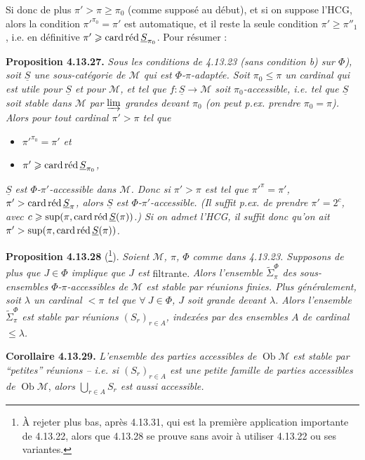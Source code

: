 \documentclass[11pt]{article}
\newcommand{\msp}[1]{\marginpar{\footnotesize [#1]}}
\newcommand{\Ob}{\operatorname{Ob}}
\newcommand{\cardred}{\mathop{\textup{card\,réd}}\nolimits}
\begin{document}
\msp{page 348}
Si donc de plus $\pi'>\pi\geqslant\pi_0$ (comme supposé au début), et si on suppose l'HCG, alors la condition $\pi'^{\pi_0}=\pi'$ est automatique, et il reste la seule condition $\pi'\geqslant\pi''_1$, i.e. en définitive $\pi'\geqslant\cardred\underline{S}_{\pi_0}$. Pour résumer :

\textbf{Proposition 4.13.27.} \textit{Sous les conditions de 4.13.23 (sans condition b) sur $\Phi$), soit $\underline{S}$ une sous-catégorie de $\mathcal{M}$ qui est $\Phi$-$\pi$-adaptée. Soit $\pi_0\leqslant\pi$ un cardinal qui est utile pour $\underline{S}$ et pour $\mathcal{M}$, et tel que $f:\underline{S}\longrightarrow\mathcal{M}$ soit $\pi_0$-accessible, i.e. tel que $\underline{S}$ soit stable dans $\mathcal{M}$ par $\varinjlim$ grandes devant $\pi_0$ (on peut p.ex. prendre $\pi_0=\pi$). Alors pour tout cardinal $\pi'>\pi$ tel que}
\begin{itemize}[leftmargin=2.5em]
\item[\textit{a)}] \textit{$\pi'^{\pi_0}=\pi'$ et}
\item[\textit{b)}] \textit{$\pi'\geqslant\cardred\underline{S}_{\pi_0}$,}
\end{itemize}
\textit{$\underline{S}$ est $\Phi$-$\pi'$-accessible dans $\mathcal{M}$. Donc si $\pi'>\pi$ est tel que $\pi'^{\pi}=\pi'$, $\pi'>\cardred\underline{S}_\pi$, alors $\underline{S}$ est $\Phi$-$\pi'$-accessible. (Il suffit p.ex. de prendre $\pi'=2^c$, avec $c\geqslant\sup(\pi,\cardred\underline{S}(\pi))$.) Si on admet l'HCG, il suffit donc qu'on ait $\pi'>\sup(\pi,\cardred\underline{S}(\pi))$.}

\msp{page 349}
\textbf{Proposition 4.13.28} (\footnote{À rejeter plus bas, après 4.13.31, qui est la première application importante de 4.13.22, alors que 4.13.28 se prouve sans avoir à utiliser 4.13.22 ou ses variantes.}). \textit{Soient $\mathcal{M}$, $\pi$, $\Phi$ comme dans 4.13.23. Supposons de plus que $J\in\Phi$ implique que $J$ est} filtrante. \textit{Alors l'ensemble $\tilde{\Sigma}^{\Phi}_{\pi}$ des sous-ensembles $\Phi$-$\pi$-accessibles de $\mathcal{M}$ est stable par réunions finies. Plus généralement, soit $\lambda$ un cardinal $<\pi$ tel que $\forall\ J\in\Phi$, $J$ soit grande devant $\lambda$. Alors l'ensemble $\tilde{\Sigma}^{\Phi}_{\pi}$ est stable par réunions $(S_r)_{r\in A}$, indexées par des ensembles $A$ de cardinal $\leqslant\lambda$.}

\textbf{Corollaire 4.13.29.} \textit{L'ensemble des parties accessibles de} $\Ob\mathcal{M}$ \textit{est stable par “petites” réunions -- i.e. si $(S_r)_{r\in A}$ est une petite famille de parties accessibles de} $\Ob\mathcal{M}$, \textit{alors $\bigcup_{r\in A}S_r$ est aussi accessible.}
\end{document}
